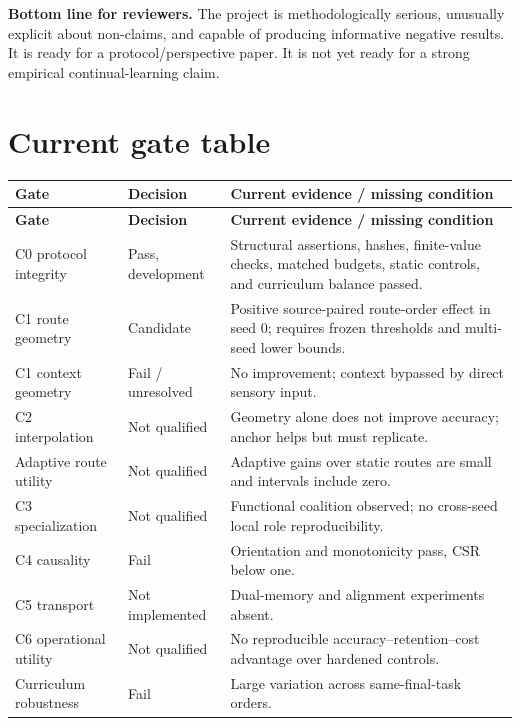 \documentclass[11pt,a4paper]{article}
\begin{document}
\begin{summarybox}
\textbf{Bottom line for reviewers.} The project is methodologically serious, unusually explicit about non-claims, and capable of producing informative negative results. It is ready for a protocol/perspective paper. It is not yet ready for a strong empirical continual-learning claim.
\end{summarybox}

\appendix
\section{Current gate table}

\begin{longtable}{p{3.5cm}p{2.4cm}p{8.0cm}}
\toprule
\textbf{Gate} & \textbf{Decision} & \textbf{Current evidence / missing condition}\\
\midrule
\endfirsthead
\toprule
\textbf{Gate} & \textbf{Decision} & \textbf{Current evidence / missing condition}\\
\midrule
\endhead
C0 protocol integrity & Pass, development & Structural assertions, hashes, finite-value checks, matched budgets, static controls, and curriculum balance passed.\\
C1 route geometry & Candidate & Positive source-paired route-order effect in seed 0; requires frozen thresholds and multi-seed lower bounds.\\
C1 context geometry & Fail / unresolved & No improvement; context bypassed by direct sensory input.\\
C2 interpolation & Not qualified & Geometry alone does not improve accuracy; anchor helps but must replicate.\\
Adaptive route utility & Not qualified & Adaptive gains over static routes are small and intervals include zero.\\
C3 specialization & Not qualified & Functional coalition observed; no cross-seed local role reproducibility.\\
C4 causality & Fail & Orientation and monotonicity pass, CSR below one.\\
C5 transport & Not implemented & Dual-memory and alignment experiments absent.\\
C6 operational utility & Not qualified & No reproducible accuracy--retention--cost advantage over hardened controls.\\
Curriculum robustness & Fail & Large variation across same-final-task orders.\\
\bottomrule
\end{longtable}
\end{document}
